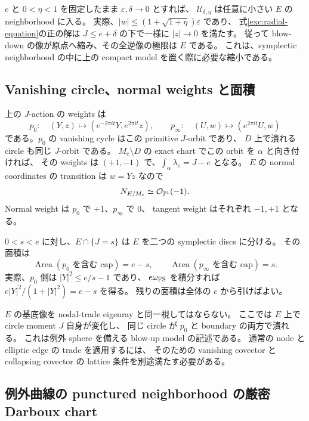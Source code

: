 \begin{remark}[縮小できる範囲]
\label{exc:shrink}
$e$ と $0<\eta<1$ を固定したまま $\varepsilon,\delta\to0$ とすれば、
$\mathcal U_{\delta,\eta}$ は任意に小さい $E$ の neighborhood に入る。
実際、$|w|\le(1+\sqrt{1+\eta})\varepsilon$ であり、
式\eqref{exc:radial-equation}の正の解は $J\le e+\delta$ の下で一様に $|z|\to0$ を満たす。
従って blow-down の像が原点へ縮み、その全逆像の極限は $E$ である。
これは、symplectic neighborhood の中に上の compact model を置く際に必要な縮小である。
\end{remark}

\subsection{Vanishing circle、normal weights と面積}

上の $J$-action の weights は
\begin{equation}\label{exc:weights}
 p_0:\quad(Y,z)\longmapsto
 (e^{-2\pi it}Y,e^{2\pi it}z),
 \qquad
 p_\infty:\quad(U,w)\longmapsto(e^{2\pi it}U,w)
\end{equation}
である。$p_0$ の vanishing cycle はこの primitive $J$-orbit であり、
$D$ 上で潰れる circle も同じ $J$-orbit である。
$M_e\setminus D$ の exact chart でこの orbit を $\alpha$ と向き付ければ、
その weights は $(+1,-1)$ で、$\int_\alpha\lambda_e=J-e$ となる。
$E$ の normal coordinates の transition は $w=Yz$ なので
\[
 N_{E/M_e}\simeq\mathcal O_{\mathbb P^1}(-1).
\]
Normal weight は $p_0$ で $+1$、$p_\infty$ で $0$、
tangent weight はそれぞれ $-1,+1$ となる。

$0<s<e$ に対し、$E\cap\{J=s\}$ は $E$ を二つの symplectic discs に分ける。
その面積は
\begin{equation}\label{exc:cap-areas}
 \operatorname{Area}(\text{$p_0$ を含む cap})=e-s,
 \qquad
 \operatorname{Area}(\text{$p_\infty$ を含む cap})=s.
\end{equation}
実際、$p_0$ 側は $|Y|^2\le e/s-1$ であり、
$e\omega_{\rm FS}$ を積分すれば $e|Y|^2/(1+|Y|^2)=e-s$ を得る。
残りの面積は全体の $e$ から引けばよい。

$E$ の基底像を nodal-trade eigenray と同一視してはならない。
ここでは $E$ 上で circle moment $J$ 自身が変化し、
同じ circle が $p_0$ と boundary の両方で潰れる。
これは例外 sphere を備える blow-up model の記述である。
通常の node と elliptic edge の trade を適用するには、
そのための vanishing covector と collapsing covector の lattice 条件を別途満たす必要がある。

\subsection{例外曲線の punctured neighborhood の厳密 Darboux chart}

